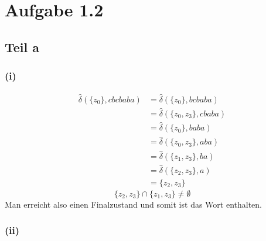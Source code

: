 \documentclass[10pt,a4paper]{article}
\begin{document}
\section{Aufgabe 1.2}

\subsection{Teil a}

\subsubsection{(i)}

\begin{align*}
  \hat{\delta}(\{z_{0}\}, cbcbaba) & = \hat{\delta}(\{ z_{0} \}, bcbaba)\\
  & = \hat{\delta}(\{ z_{0}, z_{3} \}, cbaba)\\
  & = \hat{\delta}(\{ z_{0} \}, baba)\\
  & = \hat{\delta}(\{ z_{0}, z_{3} \}, aba)\\
  & = \hat{\delta}(\{ z_{1}, z_{3} \}, ba)\\
  & = \hat{\delta}(\{ z_{2}, z_{3} \}, a)\\
  & = \{ z_{2}, z_{3} \}
\end{align*}
\begin{equation}
  \{ z_{2}, z_{3} \} \cap \{ z_{1}, z_{3} \} \ne \emptyset
\end{equation}
Man erreicht also einen Finalzustand und somit ist das Wort enthalten.

\subsubsection{(ii)}
\end{document}
